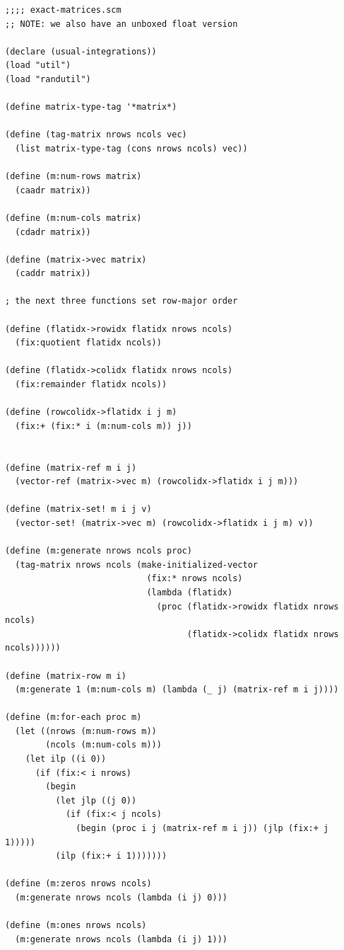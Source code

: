 \documentclass{article}
\begin{document}
\begin{verbatim}
;;;; exact-matrices.scm
;; NOTE: we also have an unboxed float version

(declare (usual-integrations))
(load "util")
(load "randutil")

(define matrix-type-tag '*matrix*)

(define (tag-matrix nrows ncols vec)
  (list matrix-type-tag (cons nrows ncols) vec))

(define (m:num-rows matrix)
  (caadr matrix))

(define (m:num-cols matrix)
  (cdadr matrix))

(define (matrix->vec matrix)
  (caddr matrix))

; the next three functions set row-major order

(define (flatidx->rowidx flatidx nrows ncols)
  (fix:quotient flatidx ncols))

(define (flatidx->colidx flatidx nrows ncols)
  (fix:remainder flatidx ncols))

(define (rowcolidx->flatidx i j m)
  (fix:+ (fix:* i (m:num-cols m)) j))


(define (matrix-ref m i j)
  (vector-ref (matrix->vec m) (rowcolidx->flatidx i j m)))

(define (matrix-set! m i j v)
  (vector-set! (matrix->vec m) (rowcolidx->flatidx i j m) v))

(define (m:generate nrows ncols proc)
  (tag-matrix nrows ncols (make-initialized-vector
                            (fix:* nrows ncols)
                            (lambda (flatidx)
                              (proc (flatidx->rowidx flatidx nrows ncols)
                                    (flatidx->colidx flatidx nrows ncols))))))

(define (matrix-row m i)
  (m:generate 1 (m:num-cols m) (lambda (_ j) (matrix-ref m i j))))

(define (m:for-each proc m)
  (let ((nrows (m:num-rows m))
        (ncols (m:num-cols m)))
    (let ilp ((i 0))
      (if (fix:< i nrows)
        (begin
          (let jlp ((j 0))
            (if (fix:< j ncols)
              (begin (proc i j (matrix-ref m i j)) (jlp (fix:+ j 1)))))
          (ilp (fix:+ i 1)))))))

(define (m:zeros nrows ncols)
  (m:generate nrows ncols (lambda (i j) 0)))

(define (m:ones nrows ncols)
  (m:generate nrows ncols (lambda (i j) 1)))


\end{verbatim}
\end{document}
